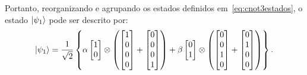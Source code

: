 Portanto, reorganizando e agrupando os estados definidos em~\eqref{eq:cnot3estados}, o estado $\ket{\psi_1}$ pode ser descrito por:
\begin{equation}\label{eq:psi1}
\ket{\psi_1} = \frac{1}{\sqrt{2}} \left\{  \alpha \begin{bmatrix}
1 \\
0
\end{bmatrix} \otimes \left( \begin{bmatrix}
1 \\
0 \\
0 \\
0
\end{bmatrix} + \begin{bmatrix}
0 \\
0 \\
0 \\
1
\end{bmatrix}\right) + \beta \begin{bmatrix}
0 \\
1
\end{bmatrix} \otimes \left( \begin{bmatrix}
0 \\
0 \\
1 \\
0
\end{bmatrix} + \begin{bmatrix}
0 \\
1 \\
0 \\
0
\end{bmatrix}\right) \right\}.
\end{equation}

